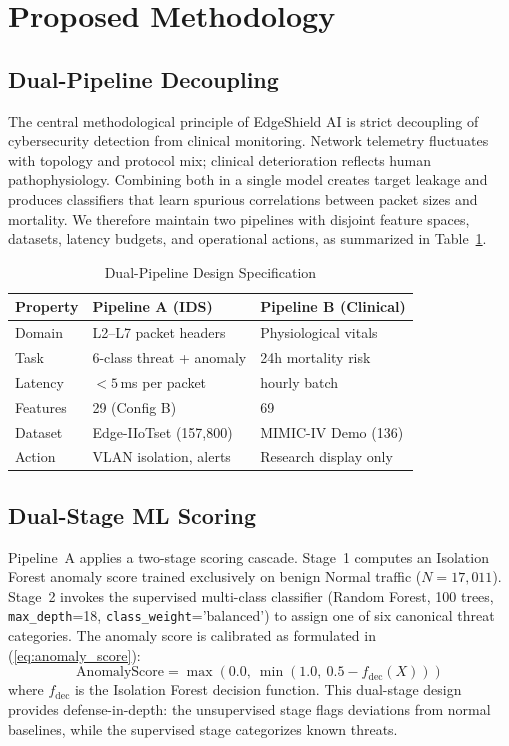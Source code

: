 \documentclass[conference]{IEEEtran}
\begin{document}
\section{Proposed Methodology}

\subsection{Dual-Pipeline Decoupling}
The central methodological principle of EdgeShield AI is strict decoupling of cybersecurity detection from clinical monitoring. Network telemetry fluctuates with topology and protocol mix; clinical deterioration reflects human pathophysiology. Combining both in a single model creates target leakage and produces classifiers that learn spurious correlations between packet sizes and mortality. We therefore maintain two pipelines with disjoint feature spaces, datasets, latency budgets, and operational actions, as summarized in Table~\ref{tab:pipelines}.

\begin{table}[t]
\centering
\caption{Dual-Pipeline Design Specification}
\footnotesize
\setlength{\tabcolsep}{3pt}
\begin{tabular}{lll}
\toprule
\textbf{Property} & \textbf{Pipeline A (IDS)} & \textbf{Pipeline B (Clinical)} \\
\midrule
Domain & L2--L7 packet headers & Physiological vitals \\
Task & 6-class threat + anomaly & 24h mortality risk \\
Latency & $<5$\,ms per packet & hourly batch \\
Features & 29 (Config B) & 69 \\
Dataset & Edge-IIoTset (157,800) & MIMIC-IV Demo (136) \\
Action & VLAN isolation, alerts & Research display only \\
\bottomrule
\end{tabular}
\label{tab:pipelines}
\end{table}

\subsection{Dual-Stage ML Scoring}
Pipeline~A applies a two-stage scoring cascade. Stage~1 computes an Isolation Forest anomaly score trained exclusively on benign Normal traffic ($N=17{,}011$). Stage~2 invokes the supervised multi-class classifier (Random Forest, 100 trees, \texttt{max\_depth}=18, \texttt{class\_weight}='balanced') to assign one of six canonical threat categories. The anomaly score is calibrated as formulated in (\ref{eq:anomaly_score}):
\begin{equation}
\text{AnomalyScore} = \max\!\left(0.0,\ \min\!\left(1.0,\ 0.5 - f_{\text{dec}}(X)\right)\right)
\label{eq:anomaly_score}
\end{equation}
where $f_{\text{dec}}$ is the Isolation Forest decision function. This dual-stage design provides defense-in-depth: the unsupervised stage flags deviations from normal baselines, while the supervised stage categorizes known threats.
\end{document}
